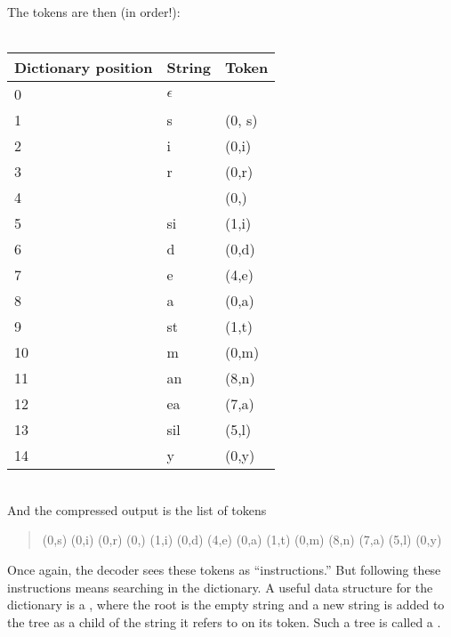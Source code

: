 \documentclass[a4paper, 11pt, openany]{book}
\begin{document}
The tokens are then (in order!):\\
~\\
\begin{tabular}{l|l|l}
     Dictionary position    & String    & Token  \\
     \hline
     0                      &  $\epsilon$         &        \\
     1                        & s           &  (0, s)      \\
     2                   & i          & (0,i)       \\
     3                   &  r         & (0,r)       \\
     4                   &  \textvisiblespace         & (0,\textvisiblespace)       \\
     5                   &  si         &    (1,i)    \\
     6                   &  d         & (0,d)       \\
     7                   &  \textvisiblespace e         &  (4,e)      \\
     8                   &  a         & (0,a)       \\
     9                   &  st         &    (1,t)    \\
     10                   & m          &    (0,m)    \\
     11                   & an          &   (8,n)     \\
     12                   & \textvisiblespace ea          & (7,a)       \\
     13                   & sil          &  (5,l)      \\
     14                   & y          &    (0,y)
\end{tabular}
~\\
And the compressed output is the list of tokens
\begin{quote}
    (0,s) (0,i) (0,r) (0,\textvisiblespace) (1,i) (0,d) (4,e) (0,a) (1,t) (0,m) (8,n) (7,a) (5,l) (0,y)
\end{quote}

Once again, the decoder sees these tokens as ``instructions.'' But following these instructions means searching in the dictionary. A useful data structure for the dictionary is a , where the root is the empty string and a new string is added to the tree as a child of the string it refers to on its token. Such a tree is called a .
\end{document}
